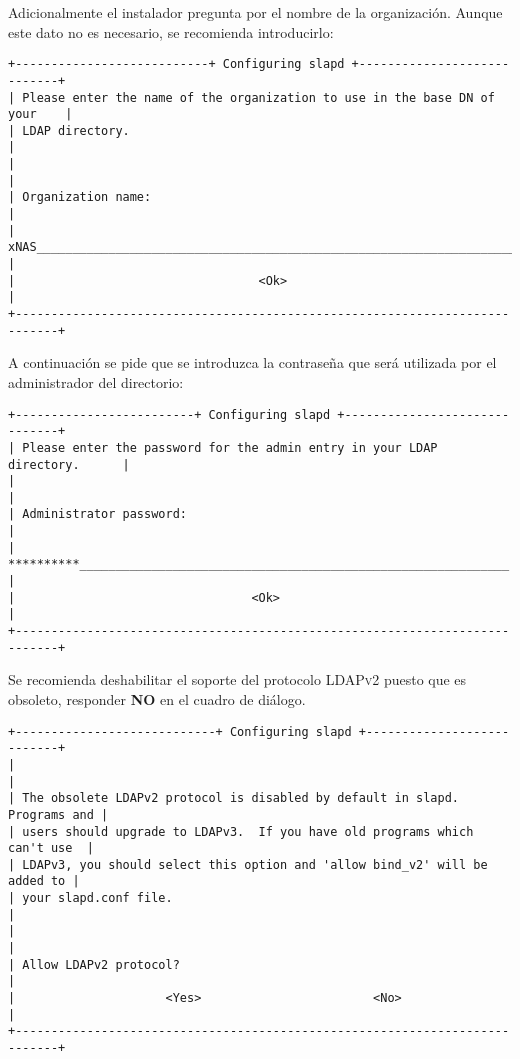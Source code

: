 Adicionalmente el instalador pregunta por el nombre de la organizaci\'{o}n. Aunque este dato no es necesario, se recomienda introducirlo:

{
\scriptsize
\linespread{1}
\begin{verbatim}
+---------------------------+ Configuring slapd +----------------------------+
| Please enter the name of the organization to use in the base DN of your    |
| LDAP directory.                                                            |
|                                                                            |
| Organization name:                                                         |
| xNAS_____________________________________________________________________  |
|                                  <Ok>                                      |
+----------------------------------------------------------------------------+
\end{verbatim}
}

A continuaci\'{o}n se pide que se introduzca la contrase\~{n}a que ser\'{a} utilizada por el administrador del directorio:

{
\scriptsize
\linespread{1}
\begin{verbatim}
+-------------------------+ Configuring slapd +------------------------------+
| Please enter the password for the admin entry in your LDAP directory.      |
|                                                                            |
| Administrator password:                                                    |
| **********____________________________________________________________     |
|                                 <Ok>                                       |
+----------------------------------------------------------------------------+
\end{verbatim}
}

Se recomienda deshabilitar el soporte del protocolo \textsc{LDAPv2} puesto que es obsoleto, responder \textbf{NO} en el cuadro de di\'{a}logo.

{
\scriptsize
\linespread{1}
\begin{verbatim}
+----------------------------+ Configuring slapd +---------------------------+
|                                                                            |
| The obsolete LDAPv2 protocol is disabled by default in slapd. Programs and |
| users should upgrade to LDAPv3.  If you have old programs which can't use  |
| LDAPv3, you should select this option and 'allow bind_v2' will be added to |
| your slapd.conf file.                                                      |
|                                                                            |
| Allow LDAPv2 protocol?                                                     |
|                     <Yes>                        <No>                      |
+----------------------------------------------------------------------------+
\end{verbatim}
}

